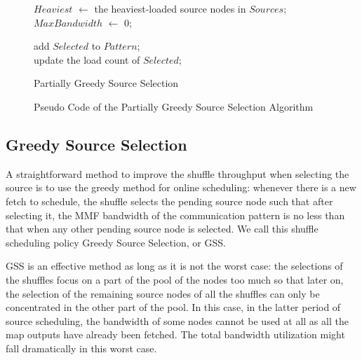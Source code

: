 \documentclass[10pt,journal,compsoc]{IEEEtran}
\makeatletter
\newcommand{\removelatexerror}{\let\@latex@error\@gobble}
\makeatother
\begin{document}
\begin{figure}[!t]
\removelatexerror
\begin{algorithm}[H]


 $Heaviest$ $\gets$ the heaviest-loaded source nodes in $Sources$;\\
 $MaxBandwidth$ $\gets$ 0;
 
add $Selected$ to $Pattern$;\\
update the load count of $Selected$;
\caption{Partially Greedy Source Selection}
\label{algo:PGSS}
\end{algorithm}
\caption{Pseudo Code of the Partially Greedy Source Selection Algorithm}
\label{fig:PGSS}
\end{figure}



\subsection{Greedy Source Selection}
A straightforward method to improve the shuffle throughput when
selecting the source is
to use the greedy method for online scheduling: 
whenever there is a new fetch to schedule, the shuffle selects the
pending source node such that after selecting it,
the MMF bandwidth of the communication pattern is no less
than that
when any other pending source node is selected. We call this shuffle
scheduling policy Greedy Source Selection, or GSS.


GSS is an effective method as long as it is not the
worst case:
the selections of the shuffles focus on a part of the pool of the
nodes too much
so that later on, the selection of the remaining source nodes of all
the shuffles can only be concentrated in the other part of the pool.
In this case, in the latter period of source scheduling,
the bandwidth of some nodes cannot be used at all as all the map
outputs have already been fetched.
The total bandwidth utilization might fall dramatically in this worst case. 
\end{document}

